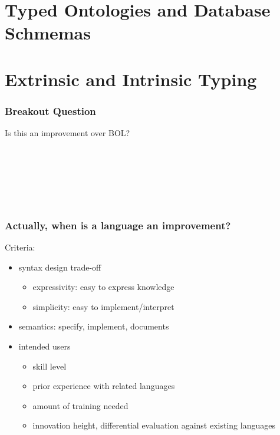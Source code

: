 \section{Typed Ontologies and Database Schmemas}



\section{Extrinsic and Intrinsic Typing}

\begin{frame}\frametitle{Breakout Question}
Is this an improvement over BOL?
\begin{commgrammar}
\\
\\
\\
\\
\\
\end{commgrammar}
\end{frame}

\begin{frame}\frametitle{Actually, when is a language an improvement?}
Criteria:
\begin{itemize}
\item syntax design trade-off
 \begin{itemize}
  \item expressivity: easy to express knowledge
  \item simplicity: easy to implement/interpret
 \end{itemize}
\item semantics: specify, implement, documents
\item intended users
 \begin{itemize}
  \item skill level
  \item prior experience with related languages
  \item amount of training needed
  \item innovation height, differential evaluation against existing languages
 \end{itemize}
\end{itemize}
\end{frame}


